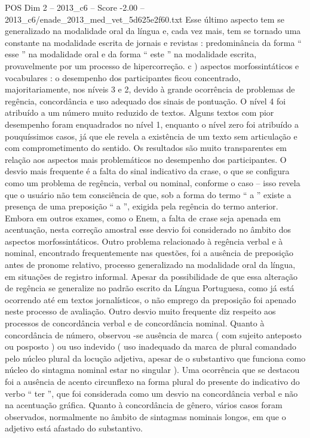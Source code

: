 \begin{textsample}{POS Dim 2 – 2013\_c6 – Score -2.00 – 2013\_c6/enade\_2013\_med\_vet\_5d625e2f60.txt}
Esse último aspecto tem se generalizado na modalidade oral da língua e, cada vez mais, tem se tornado uma constante na modalidade escrita de jornais e revistas : predominância da forma “ esse ” na modalidade oral e da forma “ este ” na modalidade escrita, provavelmente por um processo de hipercorreção. c ) aspectos morfossintáticos e vocabulares : o desempenho dos participantes ficou concentrado, majoritariamente, nos níveis 3 e 2, devido à grande ocorrência de problemas de regência, concordância e uso adequado dos sinais de pontuação.
O nível 4 foi atribuído a um número muito reduzido de textos.
Alguns textos com pior desempenho foram enquadrados no nível 1, enquanto o nível zero foi atribuído a pouquíssimos casos, já que ele revela a existência de um texto sem articulação e com comprometimento do sentido.
Os resultados são muito transparentes em relação aos aspectos mais problemáticos no desempenho dos participantes.
O desvio mais frequente é a falta do sinal indicativo da crase, o que se configura como um problema de regência, verbal ou nominal, conforme o caso – isso revela que o usuário não tem consciência de que, sob a forma do termo “ a ” existe a presença de uma preposição “ a ”, exigida pela regência do termo anterior.
Embora em outros exames, como o Enem, a falta de crase seja apenada em acentuação, nesta correção amostral esse desvio foi considerado no âmbito dos aspectos morfossintáticos.
Outro problema relacionado à regência verbal e à nominal, encontrado frequentemente nas questões, foi a ausência de preposição antes de pronome relativo, processo generalizado na modalidade oral da língua, em situações de registro informal.
Apesar da possibilidade de que essa alteração de regência se generalize no padrão escrito da Língua Portuguesa, como já está ocorrendo até em textos jornalísticos, o não emprego da preposição foi apenado neste processo de avaliação.
Outro desvio muito frequente diz respeito aos processos de concordância verbal e de concordância nominal.
Quanto à concordância de número, observou -se ausência de marca ( com sujeito anteposto ou posposto ) ou uso indevido ( uso inadequado da marca de plural comandado pelo núcleo plural da locução adjetiva, apesar de o substantivo que funciona como núcleo do sintagma nominal estar no singular ).
Uma ocorrência que se destacou foi a ausência de acento circunflexo na forma plural do presente do indicativo do verbo “ ter ”, que foi considerada como um desvio na concordância verbal e não na acentuação gráfica.
Quanto à concordância de gênero, vários casos foram observados, normalmente no âmbito de sintagmas nominais longos, em que o adjetivo está afastado do substantivo.

\end{textsample}
